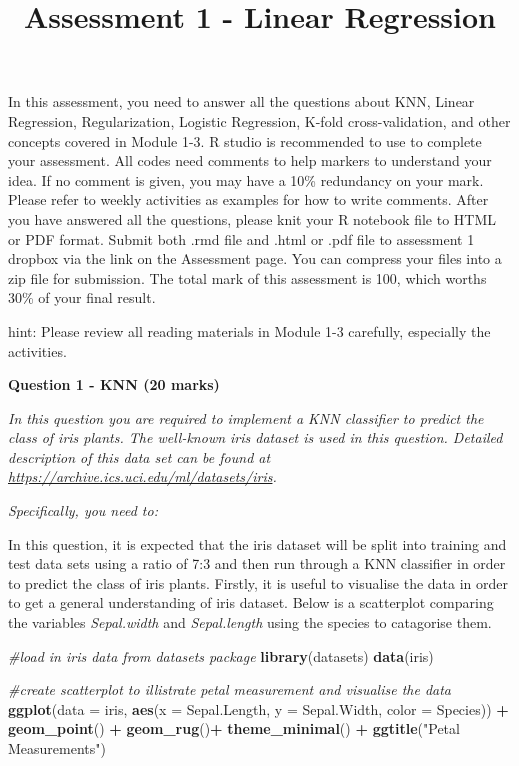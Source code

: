 \documentclass[
]{article}
\title{Assessment 1 - Linear Regression}
\author{}
\date{\vspace{-2.5em}}
\newenvironment{Shaded}{\begin{snugshade}}{\end{snugshade}}
\newcommand{\CommentTok}[1]{\textcolor[rgb]{0.56,0.35,0.01}{\textit{#1}}}
\newcommand{\DataTypeTok}[1]{\textcolor[rgb]{0.13,0.29,0.53}{#1}}
\newcommand{\KeywordTok}[1]{\textcolor[rgb]{0.13,0.29,0.53}{\textbf{#1}}}
\newcommand{\NormalTok}[1]{#1}
\newcommand{\OperatorTok}[1]{\textcolor[rgb]{0.81,0.36,0.00}{\textbf{#1}}}
\newcommand{\StringTok}[1]{\textcolor[rgb]{0.31,0.60,0.02}{#1}}
\begin{document}
\maketitle

In this assessment, you need to answer all the questions about KNN,
Linear Regression, Regularization, Logistic Regression, K-fold
cross-validation, and other concepts covered in Module 1-3. R studio is
recommended to use to complete your assessment. All codes need comments
to help markers to understand your idea. If no comment is given, you may
have a 10\% redundancy on your mark. Please refer to weekly activities
as examples for how to write comments. After you have answered all the
questions, please knit your R notebook file to HTML or PDF format.
Submit both .rmd file and .html or .pdf file to assessment 1 dropbox via
the link on the Assessment page. You can compress your files into a zip
file for submission. The total mark of this assessment is 100, which
worths 30\% of your final result.

hint: Please review all reading materials in Module 1-3 carefully,
especially the activities.

\textbf{Question 1 - KNN (20 marks)}

\emph{In this question you are required to implement a KNN classifier to
predict the class of iris plants. The well-known iris dataset is used in
this question. Detailed description of this data set can be found at
\url{https://archive.ics.uci.edu/ml/datasets/iris}.}

\emph{Specifically, you need to:}

In this question, it is expected that the iris dataset will be split
into training and test data sets using a ratio of 7:3 and then run
through a KNN classifier in order to predict the class of iris plants.
Firstly, it is useful to visualise the data in order to get a general
understanding of iris dataset. Below is a scatterplot comparing the
variables \emph{Sepal.width} and \emph{Sepal.length} using the species
to catagorise them.

\begin{Shaded}
\begin{Highlighting}[]
\CommentTok{#load in iris data from datasets package}
\KeywordTok{library}\NormalTok{(datasets)}
\KeywordTok{data}\NormalTok{(iris)}

\CommentTok{#create scatterplot to illistrate petal measurement and visualise the data }
\KeywordTok{ggplot}\NormalTok{(}\DataTypeTok{data =}\NormalTok{ iris, }\KeywordTok{aes}\NormalTok{(}\DataTypeTok{x =}\NormalTok{ Sepal.Length, }\DataTypeTok{y =}\NormalTok{ Sepal.Width, }\DataTypeTok{color =}\NormalTok{ Species)) }\OperatorTok{+}\StringTok{ }
\StringTok{    }\KeywordTok{geom_point}\NormalTok{() }\OperatorTok{+}\StringTok{ }\KeywordTok{geom_rug}\NormalTok{()}\OperatorTok{+}\StringTok{ }\KeywordTok{theme_minimal}\NormalTok{() }\OperatorTok{+}\StringTok{ }\KeywordTok{ggtitle}\NormalTok{(}\StringTok{"Petal Measurements"}\NormalTok{)}
\end{Highlighting}
\end{Shaded}
\end{document}
